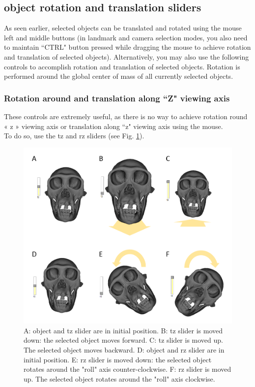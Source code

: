 \subsection{object rotation and translation sliders}
	As seen earlier, selected objects can be translated and rotated using the mouse left and middle buttons
(in landmark and camera selection modes, you also need to maintain ``CTRL" button pressed
while dragging the mouse to achieve rotation and translation of selected objects). Alternatively, you
may also use the following controls to accomplish rotation and translation of selected objects. Rotation
is performed around the global center of mass of all currently selected objects.

\subsubsection{Rotation around and translation along ``Z" viewing axis }

These controls are extremely useful, as there is no way to achieve rotation round « z » viewing axis or translation along ``z" viewing axis using the
mouse. \\ To do so, use the tz and rz sliders (see Fig. \ref{move_z}).


\begin{figure}
  \centering
  \includegraphics[scale=0.45]{images/06/objects/move_objects_z.png} 
	\caption{A: object and tz slider are in initial position. B: tz slider is moved down: the selected object moves forward. C: tz slider is moved up. The selected object moves backward. D: object and rz slider are in initial position. E: rz slider is moved down: the selected object rotates around the "roll" axis counter-clockwise. F: rz slider is moved up. The selected object rotates around the "roll" axis clockwise.}
\label{move_z}
 
\end{figure}



